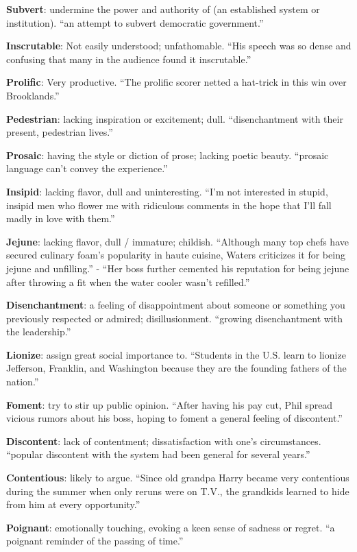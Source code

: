 \documentclass[12pt, a4paper]{ximera}
\begin{document}
\textbf{Subvert}: undermine the power and authority of (an established system or institution). ``an attempt to subvert democratic government.''

\textbf{Inscrutable}: Not easily understood; unfathomable. ``His speech was so dense and confusing that many in the audience found it inscrutable.''

\textbf{Prolific}: Very productive. ``The prolific scorer netted a hat-trick in this win over Brooklands.''

\textbf{Pedestrian}: lacking inspiration or excitement; dull. ``disenchantment with their present, pedestrian lives.''

\textbf{Prosaic}: having the style or diction of prose; lacking poetic beauty. ``prosaic language can't convey the experience.''

\textbf{Insipid}: lacking flavor, dull and uninteresting. ``I'm not interested in stupid, insipid men who flower me with ridiculous comments in the hope that I'll fall madly in love with them.''

\textbf{Jejune}: lacking flavor, dull / immature; childish. ``Although many top chefs have secured culinary foam's popularity in haute cuisine, Waters criticizes it for being jejune and unfilling.'' - ``Her boss further cemented his reputation for being jejune after throwing a fit when the water cooler wasn't refilled.''

\textbf{Disenchantment}: a feeling of disappointment about someone or something you previously respected or admired; disillusionment. ``growing disenchantment with the leadership.''

\textbf{Lionize}: assign great social importance to. ``Students in the U.S. learn to lionize Jefferson, Franklin, and Washington because they are the founding fathers of the nation.''

\textbf{Foment}: try to stir up public opinion. ``After having his pay cut, Phil spread vicious rumors about his boss, hoping to foment a general feeling of discontent.''

\textbf{Discontent}: lack of contentment; dissatisfaction with one's circumstances. ``popular discontent with the system had been general for several years.''

\textbf{Contentious}: likely to argue. ``Since old grandpa Harry became very contentious during the summer when only reruns were on T.V., the grandkids learned to hide from him at every opportunity.''

\textbf{Poignant}: emotionally touching, evoking a keen sense of sadness or regret. ``a poignant reminder of the passing of time.''
\end{document}
